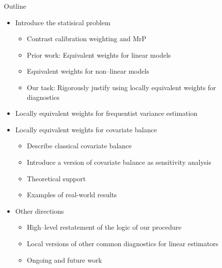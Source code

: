 

\begin{frame}{Outline}
%
%
\begin{itemize}
    \item Introduce the statisical problem
    \begin{itemize}
        \item Contrast calibration weighting and MrP
        \item Prior work: Equivalent weights for linear models
        \item Equivalent weights for non--linear models
        \item Our task: Rigorously justify using locally equivalent weights for diagnostics
    \end{itemize} \pause
    \item Locally equivalent weights for frequentist variance estimation \pause
    \item Locally equivalent weights for covariate balance
    \begin{itemize}
        \item Describe classical covariate balance
        \item Introduce a version of covariate balance as sensitivity analysis 
        \item Theoretical support
        \item Examples of real-world results
    \end{itemize} \pause
    \item Other directions
    \begin{itemize}
            \item High--level restatement of the logic of our procedure
            \item Local versions of other common diagnostics for linear estimators
            \item Ongoing and future work
    \end{itemize}
\end{itemize}
%
\end{frame}
